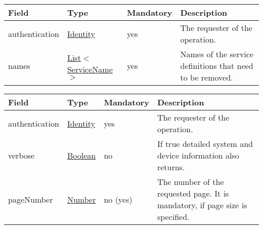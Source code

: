 \documentclass[a4paper]{arrowhead}
\newcommand{\pref}[1]{{\textcolor{ArrowheadGrey}{\hyperref[sec:model:primitives:#1]{#1}}}}
\begin{document}

\begin{table}[ht!]
\begin{tabularx}{\textwidth}{| p{2.5cm} | p{3.5cm} | p{2cm} | X |} \hline
\rowcolor{gray!33} Field & Type & Mandatory & Description \\ \hline
authentication & \hyperref[sec:model:Identity]{Identity} & yes & The requester of the operation. \\ \hline
names &  \pref{List}$<$\pref{ServiceName}$>$ & yes & Names of the service definitions that need to be removed. \\ \hline
\end{tabularx}
\end{table}


\begin{table}[ht!]
\begin{tabularx}{\textwidth}{| p{5.6cm} | p{4.9cm} | p{2cm} | X |} \hline
\rowcolor{gray!33} Field & Type & Mandatory & Description \\ \hline
authentication & \hyperref[sec:model:Identity]{Identity} & yes & The requester of the ope\-ration. \\ \hline
verbose & \pref{Boolean} & no & If true detailed system and device information also returns. \\ \hline
pageNumber & \pref{Number} & no (yes) & The number of the requested page. It is mandatory, if page size is specified. \\ \hline
\end{tabularx}
\end{table}
\end{document}
